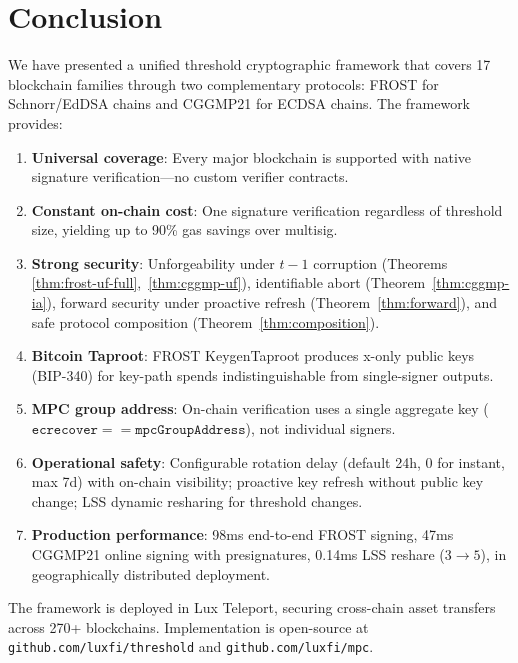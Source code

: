 \section{Conclusion}

\label{sec:conclusion}

We have presented a unified threshold cryptographic framework that covers 17 blockchain
families through two complementary protocols: FROST for Schnorr/EdDSA chains and
CGGMP21 for ECDSA chains. The framework provides:

\begin{enumerate}[nosep]
  \item \textbf{Universal coverage}: Every major blockchain is supported with native
    signature verification---no custom verifier contracts.
  \item \textbf{Constant on-chain cost}: One signature verification regardless of
    threshold size, yielding up to 90\% gas savings over multisig.
  \item \textbf{Strong security}: Unforgeability under $t{-}1$ corruption (Theorems
    \ref{thm:frost-uf-full},~\ref{thm:cggmp-uf}), identifiable abort
    (Theorem~\ref{thm:cggmp-ia}), forward security under proactive refresh
    (Theorem~\ref{thm:forward}), and safe protocol composition
    (Theorem~\ref{thm:composition}).
  \item \textbf{Bitcoin Taproot}: FROST KeygenTaproot produces x-only public keys
    (BIP-340) for key-path spends indistinguishable from single-signer outputs.
  \item \textbf{MPC group address}: On-chain verification uses a single aggregate
    key ($\texttt{ecrecover} == \texttt{mpcGroupAddress}$), not individual signers.
  \item \textbf{Operational safety}: Configurable rotation delay (default 24h, 0 for
    instant, max 7d) with on-chain visibility; proactive key refresh without public
    key change; LSS dynamic resharing for threshold changes.
  \item \textbf{Production performance}: 98ms end-to-end FROST signing, 47ms CGGMP21
    online signing with presignatures, 0.14ms LSS reshare ($3 \to 5$), in
    geographically distributed deployment.
\end{enumerate}

The framework is deployed in Lux Teleport, securing cross-chain asset transfers across
270+ blockchains. Implementation is open-source at \texttt{github.com/luxfi/threshold}
and \texttt{github.com/luxfi/mpc}.

